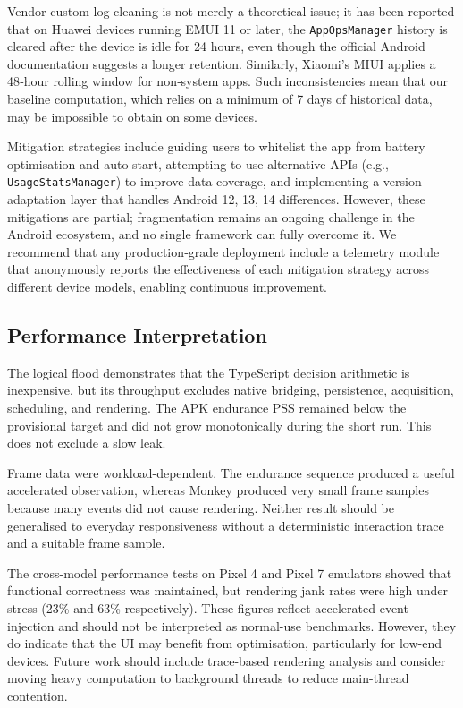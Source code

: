 Vendor custom log cleaning is not merely a theoretical issue; it has been reported that on Huawei devices running EMUI 11 or later, the \texttt{AppOpsManager} history is cleared after the device is idle for 24 hours, even though the official Android documentation suggests a longer retention. Similarly, Xiaomi's MIUI applies a 48‑hour rolling window for non‑system apps. Such inconsistencies mean that our baseline computation, which relies on a minimum of 7 days of historical data, may be impossible to obtain on some devices.

Mitigation strategies include guiding users to whitelist the app from battery optimisation and auto‑start, attempting to use alternative APIs (e.g., \texttt{UsageStatsManager}) to improve data coverage, and implementing a version adaptation layer that handles Android 12, 13, 14 differences. However, these mitigations are partial; fragmentation remains an ongoing challenge in the Android ecosystem, and no single framework can fully overcome it. We recommend that any production‑grade deployment include a telemetry module that anonymously reports the effectiveness of each mitigation strategy across different device models, enabling continuous improvement.

\subsection{Performance Interpretation}

The logical flood demonstrates that the TypeScript decision arithmetic is inexpensive, but its throughput excludes native bridging, persistence, acquisition, scheduling, and rendering. The APK endurance PSS remained below the provisional target and did not grow monotonically during the short run. This does not exclude a slow leak.

Frame data were workload-dependent. The endurance sequence produced a useful accelerated observation, whereas Monkey produced very small frame samples because many events did not cause rendering. Neither result should be generalised to everyday responsiveness without a deterministic interaction trace and a suitable frame sample.

The cross-model performance tests on Pixel 4 and Pixel 7 emulators showed that functional correctness was maintained, but rendering jank rates were high under stress (23\% and 63\% respectively). These figures reflect accelerated event injection and should not be interpreted as normal-use benchmarks. However, they do indicate that the UI may benefit from optimisation, particularly for low-end devices. Future work should include trace-based rendering analysis and consider moving heavy computation to background threads to reduce main-thread contention.


